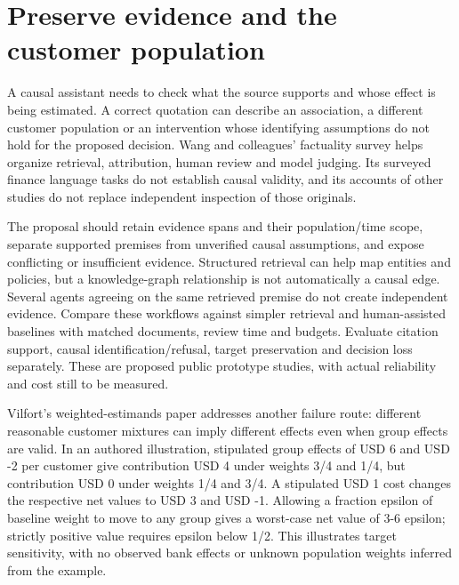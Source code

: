 \hypertarget{preserve-evidence-and-the-customer-population}{%
\section{Preserve evidence and the customer
population}\label{preserve-evidence-and-the-customer-population}}

A causal assistant needs to check what the source supports and whose
effect is being estimated. A correct quotation can describe an
association, a different customer population or an intervention whose
identifying assumptions do not hold for the proposed decision. Wang and
colleagues' factuality survey helps organize retrieval, attribution,
human review and model judging. Its surveyed finance language tasks do
not establish causal validity, and its accounts of other studies do not
replace independent inspection of those originals.
\citep{exec22_factuality_wang}

The proposal should retain evidence spans and their population/time
scope, separate supported premises from unverified causal assumptions,
and expose conflicting or insufficient evidence. Structured retrieval
can help map entities and policies, but a knowledge-graph relationship
is not automatically a causal edge. Several agents agreeing on the same
retrieved premise do not create independent evidence. Compare these
workflows against simpler retrieval and human-assisted baselines with
matched documents, review time and budgets. Evaluate citation support,
causal identification/refusal, target preservation and decision loss
separately. These are proposed public prototype studies, with actual
reliability and cost still to be measured.
\citep{exec22_factuality_wang}

Vilfort's weighted-estimands paper addresses another failure route:
different reasonable customer mixtures can imply different effects even
when group effects are valid. In an authored illustration, stipulated
group effects of USD 6 and USD -2 per customer give contribution USD 4
under weights 3/4 and 1/4, but contribution USD 0 under weights 1/4 and
3/4. A stipulated USD 1 cost changes the respective net values to USD 3
and USD -1. Allowing a fraction epsilon of baseline weight to move to
any group gives a worst-case net value of 3-6 epsilon; strictly positive
value requires epsilon below 1/2. This illustrates target sensitivity,
with no observed bank effects or unknown population weights inferred
from the example.
\citep{exec22_weighted_vilfort,exec22_weighted_reference}

